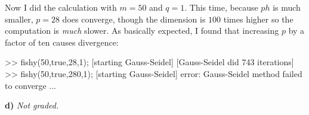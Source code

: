 \documentclass[11pt]{amsart}
\newcommand{\epart}[1]{\medskip\noindent\textbf{#1)}}
\begin{document}
Now I did the calculation with $m=50$ and $q=1$.  This time, because $ph$ is much smaller, $p=28$ does converge, though the dimension is $100$ times higher so the computation is \emph{much} slower.  As basically expected, I found that increasing $p$ by a factor of ten causes divergence:
\begin{mVerb}
>> fishy(50,true,28,1);
[starting Gauss-Seidel]
[Gauss-Seidel did 743 iterations]
>> fishy(50,true,280,1);
[starting Gauss-Seidel]
error: Gauss-Seidel method failed to converge
...
\end{mVerb}

\epart{d}  \emph{Not graded.}
\end{document}
